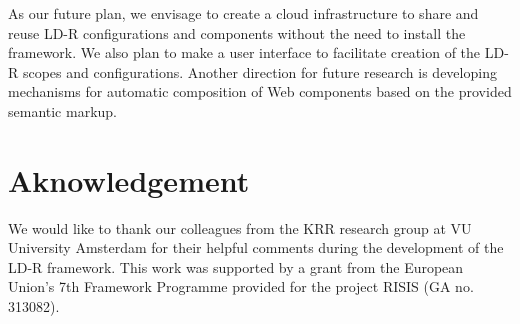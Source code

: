 \documentclass{acm_proc_article-sp}
\begin{document}
As our future plan, we envisage to create a cloud infrastructure to share and reuse LD-R configurations and components without the need to install the framework.
We also plan to make a user interface to facilitate creation of the LD-R scopes and configurations.
Another direction for future research is developing mechanisms for automatic composition of Web components based on the provided semantic markup.

\section{Aknowledgement}
We would like to thank our colleagues from the KRR research group at VU University Amsterdam for their helpful comments during the development of the LD-R framework. This work was supported by a grant from the European Union's 7th Framework Programme provided for the project RISIS (GA no. 313082).



\end{document}
